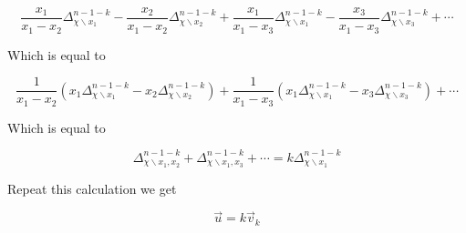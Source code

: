 \documentclass[12pt, a4paper]{article}
\theoremstyle{definition}
\theoremstyle{remark}
\begin{document}
$$
	\frac{x_1}{x_1-x_2} \Delta^{n-1-k}_{\chi \smallsetminus x_1} -
	\frac{x_2}{x_1-x_2} \Delta^{n-1-k}_{\chi \smallsetminus x_2} +
	\frac{x_1}{x_1-x_3} \Delta^{n-1-k}_{\chi \smallsetminus x_1} -
	\frac{x_3}{x_1-x_3} \Delta^{n-1-k}_{\chi \smallsetminus x_3} + \cdots
$$

Which is equal to

$$
	\frac{1}{x_1-x_2} (x_1 \Delta^{n-1-k}_{\chi \smallsetminus x_1} - x_2 \Delta^{n-1-k}_{\chi \smallsetminus x_2}) +
	\frac{1}{x_1-x_3} (x_1 \Delta^{n-1-k}_{\chi \smallsetminus x_1} - x_3 \Delta^{n-1-k}_{\chi \smallsetminus x_3}) + \cdots
$$

Which is equal to

$$
	\Delta^{n-1-k}_{\chi \smallsetminus x_1, x_2} +
	\Delta^{n-1-k}_{\chi \smallsetminus x_1, x_3} + \cdots = k  \Delta^{n-1-k}_{\chi \smallsetminus x_1}
$$

Repeat this calculation we get

$$\vec{u} = k \vec{v}_k$$
\end{document}
